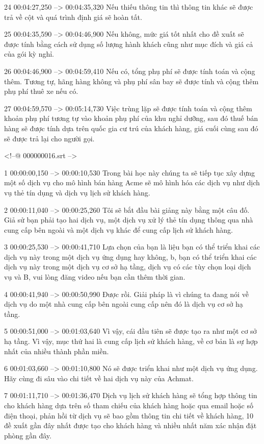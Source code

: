 24
00:04:27,250 --> 00:04:35,320
Nếu thiếu thông tin thì thông tin khác sẽ được trả về cột và quá trình định giá sẽ hoàn tất.

25
00:04:35,590 --> 00:04:46,900
Nếu không, mức giá tốt nhất cho đề xuất sẽ được tính bằng cách sử dụng số lượng hành khách cũng như mục đích và giá cả của gói kỳ nghỉ.

26
00:04:46,900 --> 00:04:59,410
Nếu có, tổng phụ phí sẽ được tính toán và cộng thêm.  Tương tự, hãng hàng không và phụ phí sân bay sẽ được tính và cộng thêm phụ phí thuê xe nếu có.

27
00:04:59,570 --> 00:05:14,730
Việc trùng lặp sẽ được tính toán và cộng thêm khoản phụ phí tương tự vào khoản phụ phí của khu nghỉ dưỡng, sau đó thuế bán hàng sẽ được tính dựa trên quốc gia cư trú của khách hàng, giá cuối cùng sau đó sẽ được trả lại cho người gọi.

<!--@ 000000016.srt -->

1
00:00:00,150 --> 00:00:10,530
Trong bài học này chúng ta sẽ tiếp tục xây dựng một số dịch vụ cho mô hình bán hàng Acme sẽ mô hình hóa các dịch vụ như dịch vụ thẻ tín dụng và dịch vụ lịch sử khách hàng.

2
00:00:11,040 --> 00:00:25,260
Tôi sẽ bắt đầu bài giảng này bằng một câu đố.  Giả sử bạn phải tạo hai dịch vụ, một dịch vụ xử lý thẻ tín dụng thông qua nhà cung cấp bên ngoài và một dịch vụ khác để cung cấp lịch sử khách hàng.

3
00:00:25,530 --> 00:00:41,710
Lựa chọn của bạn là liệu bạn có thể triển khai các dịch vụ này trong một dịch vụ ứng dụng hay không, b, bạn có thể triển khai các dịch vụ này trong một dịch vụ cơ sở hạ tầng, dịch vụ có các tùy chọn loại dịch vụ và B, vui lòng đăng video nếu bạn cần thêm thời gian.

4
00:00:41,940 --> 00:00:50,990
Được rồi.  Giải pháp là vì chúng ta đang nói về dịch vụ do một nhà cung cấp bên ngoài cung cấp nên đó là dịch vụ cơ sở hạ tầng.

5
00:00:51,000 --> 00:01:03,640
Vì vậy, cái đầu tiên sẽ được tạo ra như một cơ sở hạ tầng.  Vì vậy, mục thứ hai là cung cấp lịch sử khách hàng, về cơ bản là sự hợp nhất của nhiều thành phần miền.

6
00:01:03,660 --> 00:01:10,800
Nó sẽ được triển khai như một dịch vụ ứng dụng.  Hãy cùng đi sâu vào chi tiết về hai dịch vụ này của Achmat.

7
00:01:11,710 --> 00:01:36,470
Dịch vụ lịch sử khách hàng sẽ tổng hợp thông tin cho khách hàng dựa trên số tham chiếu của khách hàng hoặc qua email hoặc số điện thoại, phản hồi từ dịch vụ sẽ bao gồm thông tin chi tiết về khách hàng, 10 đề xuất gần đây nhất được tạo cho khách hàng và nhiều nhất  năm xác nhận đặt phòng gần đây.

